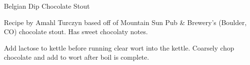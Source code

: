 \stylesection{\stylesweetstout}

\begin{recipe}{Belgian Dip Chocolate Stout} %

\begin{aboutblock}
Recipe by Amahl Turczyn based off of Mountain Sun Pub \& Brewery's
(Boulder, CO) chocolate stout. Has sweet chocolaty notes.
\end{aboutblock}


\begin{methodandtiming}
 
\begin{mashsteps}
\end{mashsteps}

\begin{directions}
Add lactose to kettle before running clear wort into the kettle. Coarsely chop
chocolate and add to wort after boil is complete.
\end{directions}

\end{methodandtiming}

\recipebreak

\begin{ingredientsblock}

\begin{malts}
\end{malts}

\begin{hops}
\end{hops}


\end{ingredientsblock}

\end{recipe}

